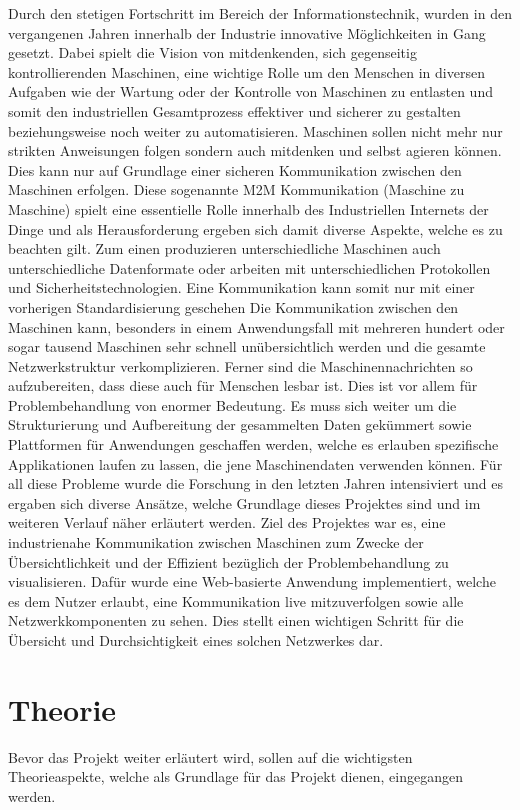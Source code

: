 \documentclass[
	12pt,								%
	DIV10,
	a4paper,         		%
	oneside,						%
	parskip=half,				%
	headings=normal,			%
	listof=totoc,					%
	bibliography=totoc,						%
	index=totoc,						%
	final								%
]{scrartcl}
\begin{document}
Durch den stetigen Fortschritt im Bereich der Informationstechnik, wurden in den vergangenen Jahren innerhalb der Industrie innovative Möglichkeiten in Gang gesetzt. Dabei spielt die Vision von mitdenkenden, sich gegenseitig kontrollierenden Maschinen, eine wichtige Rolle um den Menschen in diversen Aufgaben wie der Wartung oder der Kontrolle von Maschinen zu entlasten und somit den industriellen Gesamtprozess effektiver und sicherer zu gestalten beziehungsweise noch weiter zu automatisieren. Maschinen sollen nicht mehr nur strikten Anweisungen folgen sondern auch mitdenken und selbst agieren können. Dies kann nur auf Grundlage einer sicheren Kommunikation zwischen den Maschinen erfolgen. Diese sogenannte M2M Kommunikation (Maschine zu Maschine) spielt eine essentielle Rolle innerhalb des Industriellen Internets der Dinge und 
als Herausforderung ergeben sich damit diverse Aspekte, welche es zu beachten gilt. 
Zum einen produzieren unterschiedliche Maschinen auch unterschiedliche Datenformate oder arbeiten mit unterschiedlichen Protokollen und Sicherheitstechnologien. Eine Kommunikation kann somit nur mit einer vorherigen Standardisierung geschehen
Die Kommunikation zwischen den Maschinen kann, besonders in einem Anwendungsfall mit mehreren hundert oder sogar tausend Maschinen sehr schnell unübersichtlich werden und die gesamte Netzwerkstruktur verkomplizieren. Ferner sind die Maschinennachrichten so aufzubereiten, dass diese auch für Menschen lesbar ist. Dies ist vor allem für Problembehandlung von enormer Bedeutung.
Es muss sich weiter um die Strukturierung und Aufbereitung der gesammelten Daten gekümmert sowie Plattformen für Anwendungen geschaffen werden, welche es erlauben spezifische Applikationen laufen zu lassen, die jene Maschinendaten verwenden können. Für all diese Probleme wurde die Forschung in den letzten Jahren intensiviert und es ergaben sich diverse Ansätze, welche Grundlage dieses Projektes sind und im weiteren Verlauf näher erläutert werden. 
Ziel des Projektes war es, eine industrienahe Kommunikation zwischen Maschinen zum Zwecke der Übersichtlichkeit und der Effizient bezüglich der Problembehandlung zu visualisieren. Dafür wurde eine Web-basierte Anwendung implementiert, welche es dem Nutzer erlaubt, eine Kommunikation live mitzuverfolgen sowie alle Netzwerkkomponenten zu sehen. Dies stellt einen wichtigen Schritt für die Übersicht und Durchsichtigkeit eines solchen Netzwerkes dar.
\newpage
\section{Theorie}
Bevor das Projekt weiter erläutert wird, sollen auf die wichtigsten Theorieaspekte, welche als Grundlage für das Projekt dienen, eingegangen werden. 
\end{document}
